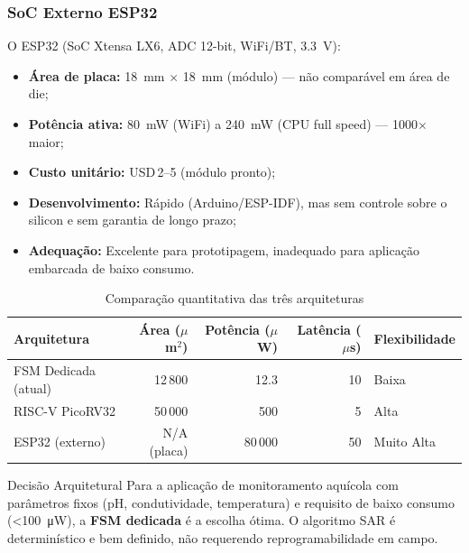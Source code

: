 \documentclass[12pt,a4paper]{article}
\begin{document}
\subsubsection{SoC Externo ESP32}

O ESP32 (SoC Xtensa LX6, ADC 12-bit, WiFi/BT, \SI{3.3}{\volt}):
\begin{itemize}
  \item \textbf{Área de placa:} \SI{18}{\milli\meter} $\times$ \SI{18}{\milli\meter}
        (módulo) — não comparável em área de die;
  \item \textbf{Potência ativa:} \SI{80}{\milli\watt} (WiFi) a \SI{240}{\milli\watt}
        (CPU full speed) — 1000$\times$ maior;
  \item \textbf{Custo unitário:} USD\,2--5 (módulo pronto);
  \item \textbf{Desenvolvimento:} Rápido (Arduino/ESP-IDF), mas sem controle
        sobre o silicon e sem garantia de longo prazo;
  \item \textbf{Adequação:} Excelente para prototipagem, inadequado para
        aplicação embarcada de baixo consumo.
\end{itemize}

\begin{table}[H]
  \centering
  \caption{Comparação quantitativa das três arquiteturas}
  \label{tab:arch_comparison}
  \begin{tabular}{lrrrl}
    \toprule
    \textbf{Arquitetura} & \textbf{Área ($\mu$m$^2$)} &
    \textbf{Potência ($\mu$W)} & \textbf{Latência ($\mu$s)} & \textbf{Flexibilidade} \\
    \midrule
    FSM Dedicada (atual) & 12\,800    & 12.3   & 10  & Baixa \\
    RISC-V PicoRV32      & 50\,000    & 500    & 5   & Alta \\
    ESP32 (externo)      & N/A (placa) & 80\,000 & 50 & Muito Alta \\
    \bottomrule
  \end{tabular}
\end{table}

\begin{infobox}{Decisão Arquitetural}
Para a aplicação de monitoramento aquícola com parâmetros fixos (pH, condutividade,
temperatura) e requisito de baixo consumo (\textless{}\SI{100}{\micro\watt}), a
\textbf{FSM dedicada} é a escolha ótima. O algoritmo SAR é determinístico e bem
definido, não requerendo reprogramabilidade em campo.
\end{infobox}
\end{document}
